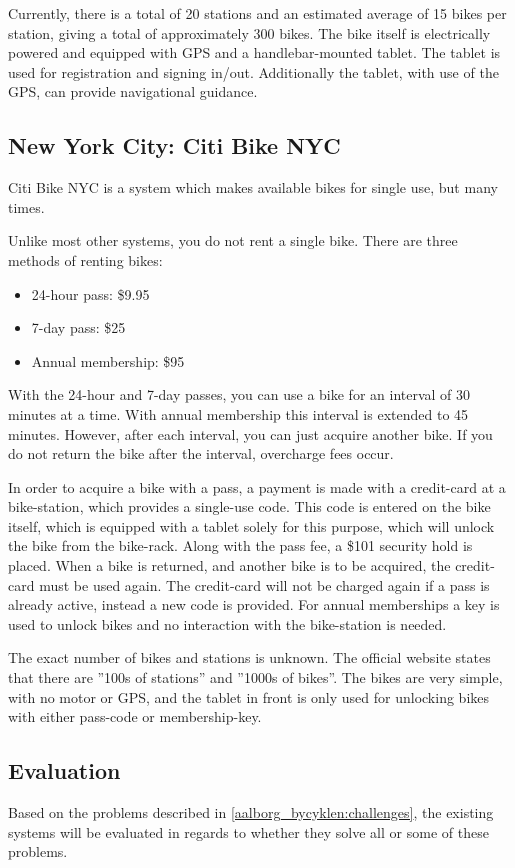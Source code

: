 Currently, there is a total of 20 stations and an estimated average of 15 bikes per station, giving a total of approximately 300 bikes.
The bike itself is electrically powered and equipped with GPS and a handlebar-mounted tablet.
The tablet is used for registration and signing in/out.
Additionally the tablet, with use of the GPS, can provide navigational guidance.

\subsection{New York City: Citi Bike NYC}
Citi Bike NYC\cite{nyc_citibike} is a system which makes available bikes for single use, but many times.

Unlike most other systems, you do not rent a single bike.
There are three methods of renting bikes:

\begin{itemize}
\item 24-hour pass: \$9.95
\item 7-day pass: \$25
\item Annual membership: \$95
\end{itemize}

With the 24-hour and 7-day passes, you can use a bike for an interval of 30 minutes at a time.
With annual membership this interval is extended to 45 minutes.
However, after each interval, you can just acquire another bike.
If you do not return the bike after the interval, overcharge fees occur.

In order to acquire a bike with a pass, a payment is made with a credit-card at a bike-station, which provides a single-use code.
This code is entered on the bike itself, which is equipped with a tablet solely for this purpose, which will unlock the bike from the bike-rack.
Along with the pass fee, a \$101 security hold is placed.
When a bike is returned, and another bike is to be acquired, the credit-card must be used again.
The credit-card will not be charged again if a pass is already active, instead a new code is provided.
For annual memberships a key is used to unlock bikes and no interaction with the bike-station is needed.

The exact number of bikes and stations is unknown.
The official website states that there are ''100s of stations'' and ''1000s of bikes''.
The bikes are very simple, with no motor or GPS, and the tablet in front is only used for unlocking bikes with either pass-code or membership-key.

\subsection{Evaluation}
Based on the problems described in \cref{aalborg_bycyklen:challenges}, the existing systems will be evaluated in regards to whether they solve all or some of these problems.

